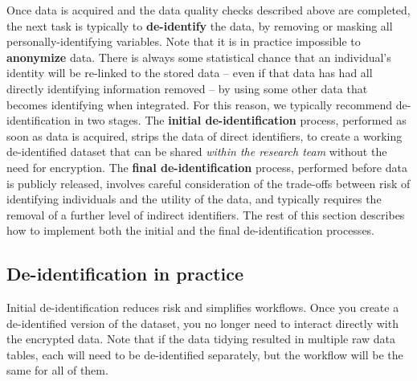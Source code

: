 Once data is acquired and the data quality checks described above are completed,
the next task is typically to \textbf{de-identify} the data,
by removing or masking all personally-identifying variables.
Note that it is in practice impossible to \textbf{anonymize} data.
There is always some statistical chance that an individual's identity
will be re-linked to the stored data
-- even if that data has had all directly identifying information removed --
by using some other data that becomes identifying when integrated.
For this reason, we typically recommend de-identification in two stages.
The \textbf{initial de-identification} process,
performed as soon as data is acquired, strips the data of direct identifiers,
to create a working de-identified dataset that
can be shared \textit{within the research team} without the need for encryption.
The \textbf{final de-identification} process,
performed before data is publicly released, involves
careful consideration of the trade-offs between
risk of identifying individuals and the utility of the data,
and typically requires the removal of a further level of indirect identifiers.
The rest of this section describes how to implement
both the initial and the final de-identification processes.


\subsection{De-identification in practice}

Initial de-identification reduces risk and simplifies workflows.
Once you create a de-identified version of the dataset,
you no longer need to interact directly with the encrypted data.
Note that if the data tidying resulted in multiple raw data tables,
each will need to be de-identified separately, but
the workflow will be the same for all of them.

